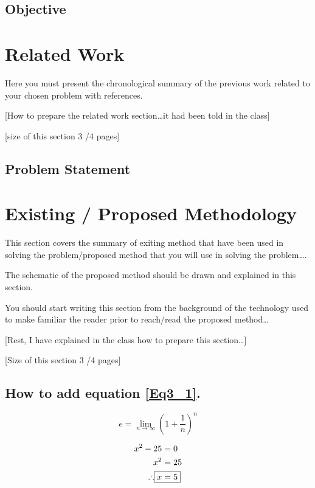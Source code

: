 \documentclass[12pt, a4paper, oneside, openright]{Thesis} %
\begin{document}
\subsection{Objective}




\section{Related Work}

Here you must present the chronological summary of the previous work related to your chosen problem with references. 

[How to prepare the related work section…it had been told in the class]

[size of this section 3 /4 pages]

\subsection{Problem Statement}

\section{Existing / Proposed Methodology}
This section covers the summary of exiting method that have been used in solving the problem/proposed method that you will use in solving the problem….

The schematic of the proposed method should be drawn and explained in this section.

You should start writing this section from the background of the technology used to make familiar the reader prior to reach/read the proposed method… 

[Rest, I have explained in the class how to prepare this section…]

[Size of this section 3 /4 pages]

\subsection{How to add equation \ref{Eq3_1}.}
\begin{equation}
e = \lim_{n\to\infty} \left(1+\frac{1}{n}\right)^n
\label{Eq3_1}
\end{equation} 

\begin{align}
	x^2 -25 &= 0 \nonumber \\
	x^2 &= 25 \nonumber \\
	\therefore \Aboxed{x &= 5}
 \label{Eq3_2}
\end{align}
\end{document}
